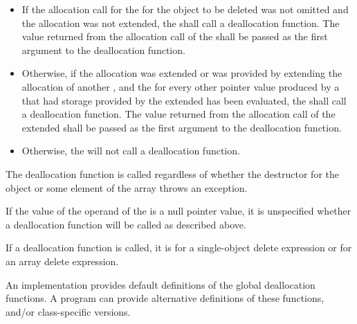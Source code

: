 \begin{itemize}
\item
If the allocation call for the  for the object to
be deleted was not omitted and the allocation was not extended, the
 shall call a deallocation
function. The value returned from the
allocation call of the  shall be passed as the
first argument to the deallocation function.

\item
Otherwise, if the allocation was extended or was provided by extending the
allocation of another , and the
 for every other pointer value produced by a
 that had storage provided by the extended
 has been evaluated, the
 shall call a deallocation function. The value
returned from the allocation call of the extended 
shall be passed as the first argument to the deallocation function.

\item
Otherwise, the  will not call a
deallocation function.
\end{itemize}
\begin{note}
The deallocation function is called regardless of whether the destructor
for the object or some element of the array throws an exception.
\end{note}
If the value of the operand of the  is a
null pointer value, it is unspecified whether a deallocation function will be
called as described above.

\pnum
If a deallocation function is called,
it is  for a single-object delete expression or
 for an array delete expression.
\begin{note}
%
An implementation provides default definitions of the global
deallocation functions.
A \Cpp{} program can provide alternative definitions of these
functions, and/or class-specific
versions.
\end{note}

